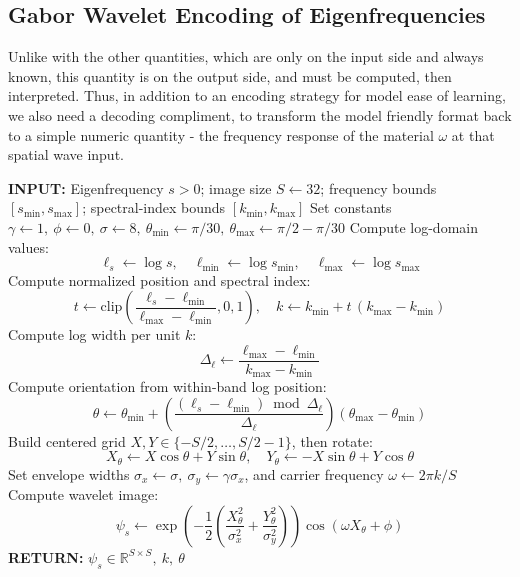 \documentclass[preprint,review,12pt]{elsarticle}
\begin{document}
\subsection{Gabor Wavelet Encoding of Eigenfrequencies}
Unlike with the other quantities, which are only on the input side and always known, this quantity is on the output side, and must be computed, then interpreted. Thus, in addition to an encoding strategy for model ease of learning, we also need a decoding compliment, to transform the model friendly format back to a simple numeric quantity - the frequency response of the material $\omega$ at that spatial wave input.
\begin{algorithm}[H]
\caption{Eigenfrequency Wavelet Encoding}
\label{alg:eigenfrequency_wavelet_encoding}
\begin{algorithmic}[1]
\STATE \textbf{INPUT:} Eigenfrequency \( s>0 \); image size \( S \leftarrow 32 \); frequency bounds \( [s_{\min}, s_{\max}] \); spectral-index bounds \( [k_{\min}, k_{\max}] \)
\STATE Set constants \( \gamma \leftarrow 1,\ \phi \leftarrow 0,\ \sigma \leftarrow 8,\ \theta_{\min}\leftarrow \pi/30,\ \theta_{\max}\leftarrow \pi/2-\pi/30 \)
\STATE Compute log-domain values:
\[
\ell_s \leftarrow \log s,\quad \ell_{\min}\leftarrow \log s_{\min},\quad \ell_{\max}\leftarrow \log s_{\max}
\]
\STATE Compute normalized position and spectral index:
\[
t \leftarrow \mathrm{clip}\!\left(\frac{\ell_s-\ell_{\min}}{\ell_{\max}-\ell_{\min}},0,1\right),\quad
k \leftarrow k_{\min} + t\,(k_{\max}-k_{\min})
\]
\STATE Compute log width per unit \(k\):
\[
\Delta_\ell \leftarrow \frac{\ell_{\max}-\ell_{\min}}{k_{\max}-k_{\min}}
\]
\STATE Compute orientation from within-band log position:
\[
\theta \leftarrow \theta_{\min} + \left(\frac{(\ell_s-\ell_{\min})\bmod \Delta_\ell}{\Delta_\ell}\right)\left(\theta_{\max}-\theta_{\min}\right)
\]
\STATE Build centered grid \(X,Y \in \{-S/2,\dots,S/2-1\}\), then rotate:
\[
X_\theta \leftarrow X\cos\theta + Y\sin\theta,\quad
Y_\theta \leftarrow -X\sin\theta + Y\cos\theta
\]
\STATE Set envelope widths \( \sigma_x \leftarrow \sigma,\ \sigma_y \leftarrow \gamma \sigma_x \), and carrier frequency \( \omega \leftarrow 2\pi k/S \)
\STATE Compute wavelet image:
\[
\psi_s \leftarrow
\exp\!\left(-\frac{1}{2}\left(\frac{X_\theta^2}{\sigma_x^2}+\frac{Y_\theta^2}{\sigma_y^2}\right)\right)\cos(\omega X_\theta+\phi)
\]
\STATE \textbf{RETURN:} \( \psi_s \in \mathbb{R}^{S\times S},\ k,\ \theta \)
\end{algorithmic}
\end{algorithm}
\end{document}
